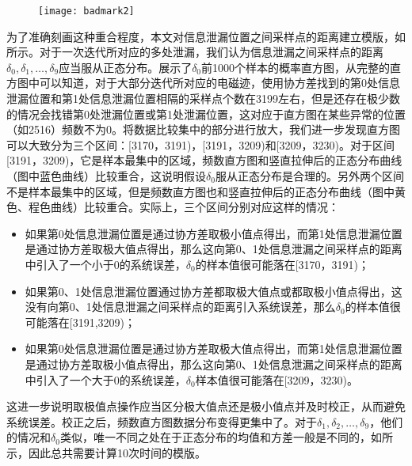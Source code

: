 {	\begin{figure}[!h]
		\begin{center}
			\texttt{[image: badmark2]}
			\label{fig:badmark2}
		\end{center}
	\end{figure}

	为了准确刻画这种重合程度，本文对信息泄漏位置之间采样点的距离建立模版，如所示。对于一次迭代所对应的多处泄漏，我们认为信息泄漏之间采样点的距离$\delta_0,\delta_1,\dots,\delta_9$应当服从正态分布。展示了$\delta_0$前1000个样本的概率直方图，从完整的直方图中可以知道，对于大部分迭代所对应的电磁迹，使用协方差找到的第0处信息泄漏位置和第1处信息泄漏位置相隔的采样点个数在3199左右，但是还存在极少数的情况会找错第0处泄漏位置或第1处泄漏位置，这对应于直方图在某些异常的位置（如2516）频数不为0。将数据比较集中的部分进行放大，我们进一步发现直方图可以大致分为三个区间：[3170，3191)，[3191，3209)和[3209，3230)。对于区间[3191，3209)，它是样本最集中的区域，频数直方图和竖直拉伸后的正态分布曲线（图中蓝色曲线）比较重合，这说明假设$\delta_0$服从正态分布是合理的。另外两个区间不是样本最集中的区域，但是频数直方图也和竖直拉伸后的正态分布曲线（图中黄色、程色曲线）比较重合。实际上，三个区间分别对应这样的情况：
	
	\begin{itemize}
		\item 如果第0处信息泄漏位置是通过协方差取极小值点得出，而第1处信息泄漏位置是通过协方差取极大值点得出，那么这向第0、1处信息泄漏之间采样点的距离中引入了一个小于0的系统误差，$\delta_0$的样本值很可能落在[3170，3191)；
		\item 如果第0、1处信息泄漏位置通过协方差都取极大值点或都取极小值点得出，这没有向第0、1处信息泄漏之间采样点的距离引入系统误差，那么$\delta_0$的样本值很可能落在[3191,3209)；
		\item 如果第0处信息泄漏位置是通过协方差取极大值点得出，而第1处信息泄漏位置是通过协方差取极小值点得出，那么这向第0、1处信息泄漏之间采样点的距离中引入了一个大于0的系统误差，$\delta_0$样本值很可能落在[3209，3230)。
	\end{itemize}

	这进一步说明取极值点操作应当区分极大值点还是极小值点并及时校正，从而避免系统误差。校正之后，频数直方图数据分布变得更集中了。对于$\delta_1,\delta_2,\dots,\delta_9$，他们的情况和$\delta_0$类似，唯一不同之处在于正态分布的均值和方差一般是不同的，如所示，因此总共需要计算10次时间的模版。
	
}
